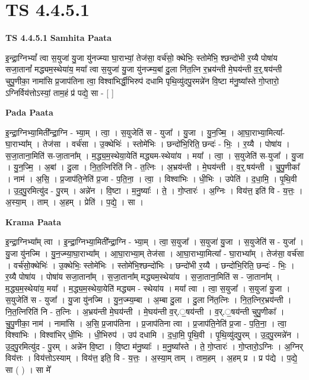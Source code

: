 \documentclass[17pt]{extarticle}
\begin{document}
\section{ TS 4.4.5.1 }

\textbf{TS 4.4.5.1 } \newline
\textbf{Samhita Paata} \newline

इ॒न्द्रा॒ग्निभ्यां᳚ त्वा स॒युजा॑ यु॒जा यु॑नज्म्या घा॒राभ्यां॒ तेज॑सा॒ वर्च॑सो॒ क्थेभिः॒ स्तोमे॑भि॒ श्छन्दो॑भी र॒य्यै पोषा॑य सजा॒तानां᳚ मद्ध्यम॒स्थेया॑य॒ मया᳚ त्वा स॒युजा॑ यु॒जा यु॑नज्म्य॒बां दु॒ला नि॑त॒त्नि र॒भ्रय॑न्ती मे॒घय॑न्ती व॒र्॒.षय॑न्ती चुपु॒णीका॒ नामा॑सि प्र॒जाप॑तिना त्वा॒ विश्वा॑भिर्द्धी॒भिरुप॑ दधामि पृथि॒व्यु॑दपु॒रमन्ने॑न वि॒ष्टा म॑नु॒ष्या᳚स्ते गो॒प्तारो॒ ऽग्निर्विय॑त्तोऽस्यां॒ ताम॒हं प्र॑ पद्ये॒ सा - [  ] \newline

\textbf{Pada Paata} \newline

इ॒न्द्रा॒ग्निभ्या॒मिती᳚न्द्रा॒ग्नि - भ्या॒म् । त्वा॒ । स॒युजेति॑ स - युजा᳚ । यु॒जा । यु॒न॒ज्मि॒ । आ॒घा॒राभ्या॒मित्या᳚-घा॒राभ्या᳚म् । तेज॑सा । वर्च॑सा । उ॒क्थेभिः॑ । स्तोमे॑भिः । छन्दो॑भि॒रिति॒ छन्दः॑ - भिः॒ । र॒य्यै । पोषा॑य । स॒जा॒ताना॒मिति॑ स-जा॒ताना᳚म् । म॒द्ध्य॒म॒स्थेया॒येति॑ मद्ध्यम-स्थेया॑य । मया᳚ । त्वा॒ । स॒युजेति॑ स-युजा᳚ । यु॒जा । यु॒न॒ज्मि॒ । अ॒बां । दु॒ला । नि॒त॒त्निरिति॑ नि - त॒त्निः । अ॒भ्रय॑न्ती । मे॒घय॑न्ती । व॒र्॒.षय॑न्ती । चु॒पु॒णीका᳚ । नाम॑ । अ॒सि॒ । प्र॒जाप॑ति॒नेति॑ प्र॒जा - प॒ति॒ना॒ । त्वा॒ । विश्वा॑भिः । धी॒भिः । उपेति॑ । द॒धा॒मि॒ । पृ॒थि॒वी । उ॒द॒पु॒रमित्यु॑द - पु॒रम् । अन्ने॑न । वि॒ष्टा । म॒नु॒ष्याः᳚ । ते॒ । गो॒प्तारः॑ । अ॒ग्निः । विय॑त्त॒ इति॑ वि - य॒त्तः॒ । अ॒स्या॒म् । ताम् । अ॒हम् । प्रेति॑ । प॒द्ये॒ । सा ।  \newline


\textbf{Krama Paata} \newline

इ॒न्द्रा॒ग्निभ्या᳚म् त्वा । इ॒न्द्रा॒ग्निभ्या॒मिती᳚न्द्रा॒ग्नि - भ्या॒म् । त्वा॒ स॒युजा᳚ । स॒युजा॑ यु॒जा । स॒युजेति॑ स - युजा᳚ । यु॒जा यु॑नज्मि । यु॒न॒ज्म्या॒घा॒राभ्या᳚म् । आ॒घा॒राभ्या॒म् तेज॑सा । आ॒घा॒राभ्या॒मित्या᳚ - घा॒राभ्या᳚म् । तेज॑सा॒ वर्च॑सा । वर्च॑सो॒क्थेभिः॑ । उ॒क्थेभिः॒ स्तोमे॑भिः । स्तोमे॑भि॒श्छन्दो॑भिः । छन्दो॑भी र॒य्यै । छन्दो॑भि॒रिति॒ छन्दः॑ - भिः॒ । र॒य्यै पोषा॑य । पोषा॑य सजा॒ताना᳚म् । स॒जा॒ताना᳚म् मद्ध्यम॒स्थेया॑य । स॒जा॒ताना॒मिति॑ स - जा॒ताना᳚म् । म॒द्ध्य॒म॒स्थेया॑य॒ मया᳚ । म॒द्ध्य॒म॒स्थेया॒येति॑ मद्ध्यम - स्थेया॑य । मया᳚ त्वा । त्वा॒ स॒युजा᳚ । स॒युजा॑ यु॒जा । स॒युजेति॑ स - युजा᳚ । यु॒जा यु॑नज्मि । यु॒न॒ज्म्य॒म्बा । अ॒म्बा दु॒ला । दु॒ला नि॑त॒त्निः । नि॒त॒त्निर॒भ्रय॑न्ती । नि॒त॒त्निरिति॑ नि - त॒त्निः । अ॒भ्रय॑न्ती मे॒घय॑न्ती । मे॒घय॑न्ती व॒र्.॒षय॑न्ती । व॒र्.॒षय॑न्ती चुपु॒णीका᳚ । चु॒पु॒णीका॒ नाम॑ । नामा॑सि । अ॒सि॒ प्र॒जाप॑तिना । प्र॒जाप॑तिना त्वा । प्र॒जाप॑ति॒नेति॑ प्र॒जा - प॒ति॒ना॒ । त्वा॒ विश्वा॑भिः । विश्वा॑भिर् धी॒भिः । धी॒भिरुप॑ । उप॑ दधामि । द॒धा॒मि॒ पृ॒थि॒वी । पृ॒थि॒व्यु॑दपु॒रम् । उ॒द॒पु॒रमन्ने॑न । उ॒द॒पु॒रमित्यु॑द - पु॒रम् । अन्ने॑न वि॒ष्टा । वि॒ष्टा म॑नु॒ष्याः᳚ । म॒नु॒ष्या᳚स्ते । ते॒ गो॒प्तारः॑ । गो॒प्तारो॒ऽग्निः । अ॒ग्निर् विय॑त्तः । विय॑त्तोऽस्याम् । विय॑त्त॒ इति॒ वि - य॒त्तः॒ । 
अ॒स्या॒म् ताम् । ताम॒हम् । अ॒हम् प्र । प्र प॑द्ये । प॒द्ये॒ सा ( ) । सा मे᳚ \newline
\end{document}
